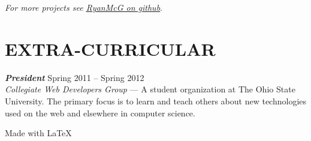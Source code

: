 \documentclass[line,letterpaper]{resume}
\begin{document}
\begin{resume}
    \vspace{-3pt}
    \hfill \emph{For more projects see
    \underline{\href{https://github.com/RyanMcG}{RyanMcG on github}}}.

    \vspace{-15pt}

    \section{\uppercase{Extra-Curricular}}
    {\sl\textbf{President}} \hfill Spring 2011 -- Spring 2012\\
    \emph{Collegiate Web Developers Group} --- A student organization at The
    Ohio State University. The primary focus is to learn and teach others about
    new technologies used on the web and elsewhere in computer science.

\end{resume}

\vspace{10pt}

\hfill Made with \LaTeX{}
\end{document}

